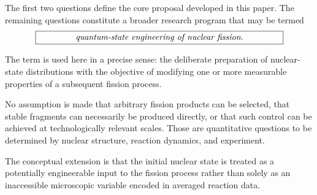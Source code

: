 The first two questions define the core proposal developed in this paper. The remaining questions constitute a broader research program that may be termed
\begin{equation}
\boxed{
\begin{minipage}{0.82\columnwidth}
\centering
\textit{quantum-state engineering of nuclear fission}.
\end{minipage}
}
\end{equation}

The term is used here in a precise sense: the deliberate preparation of nuclear-state distributions with the objective of modifying one or more measurable properties of a subsequent fission process.

No assumption is made that arbitrary fission products can be selected, that stable fragments can necessarily be produced directly, or that such control can be achieved at technologically relevant scales. Those are quantitative questions to be determined by nuclear structure, reaction dynamics, and experiment.

The conceptual extension is that the initial nuclear state is treated as a potentially engineerable input to the fission process rather than solely as an inaccessible microscopic variable encoded in averaged reaction data.
